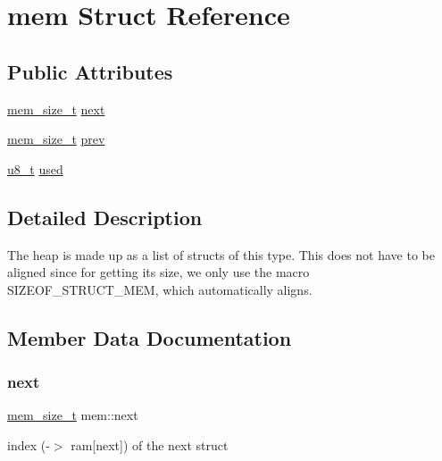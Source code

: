 \hypertarget{structmem}{}\section{mem Struct Reference}
\label{structmem}
\subsection*{Public Attributes}
\begin{DoxyCompactItemize}
\item 
\hyperlink{native_2lwip_2src_2include_2lwip_2mem_8h_a49bff6e5dd4cb95fe6dc0670962bbf54}{mem\+\_\+size\+\_\+t} \hyperlink{structmem_a5abf13a11156e92c417f7ff66ef0b5cf}{next}
\item 
\hyperlink{native_2lwip_2src_2include_2lwip_2mem_8h_a49bff6e5dd4cb95fe6dc0670962bbf54}{mem\+\_\+size\+\_\+t} \hyperlink{structmem_a9d7722ed10adf965fa98563d502f98ac}{prev}
\item 
\hyperlink{group__compiler__abstraction_ga4caecabca98b43919dd11be1c0d4cd8e}{u8\+\_\+t} \hyperlink{structmem_aa76b6a39425617435978dce903f0d456}{used}
\end{DoxyCompactItemize}


\subsection{Detailed Description}
The heap is made up as a list of structs of this type. This does not have to be aligned since for getting its size, we only use the macro S\+I\+Z\+E\+O\+F\+\_\+\+S\+T\+R\+U\+C\+T\+\_\+\+M\+EM, which automatically aligns. 

\subsection{Member Data Documentation}
\mbox{\label{structmem_a5abf13a11156e92c417f7ff66ef0b5cf}} 
\subsubsection{\texorpdfstring{next}{next}}
{\footnotesize\ttfamily \hyperlink{native_2lwip_2src_2include_2lwip_2mem_8h_a49bff6e5dd4cb95fe6dc0670962bbf54}{mem\+\_\+size\+\_\+t} mem\+::next}

index (-\/$>$ ram\mbox{[}next\mbox{]}) of the next struct \mbox{\label{structmem_a9d7722ed10adf965fa98563d502f98ac}} 

